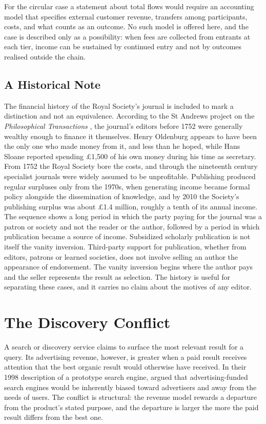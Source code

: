 \documentclass[12pt, a4paper]{article}
\begin{document}
For the circular case a statement about total flows would require an accounting model that specifies external customer revenue, transfers among participants, costs, and what counts as an outcome. No such model is offered here, and the case is described only as a possibility: when fees are collected from entrants at each tier, income can be sustained by continued entry and not by outcomes realised outside the chain.

\subsection{A Historical Note}

The financial history of the Royal Society's journal is included to mark a distinction and not an equivalence. According to the St Andrews project on the \emph{Philosophical Transactions} \citep{StAndrewsPT}, the journal's editors before 1752 were generally wealthy enough to finance it themselves. Henry Oldenburg appears to have been the only one who made money from it, and less than he hoped, while Hans Sloane reported spending \pounds1,500 of his own money during his time as secretary. From 1752 the Royal Society bore the costs, and through the nineteenth century specialist journals were widely assumed to be unprofitable. Publishing produced regular surpluses only from the 1970s, when generating income became formal policy alongside the dissemination of knowledge, and by 2010 the Society's publishing surplus was about \pounds1.4 million, roughly a tenth of its annual income. The sequence shows a long period in which the party paying for the journal was a patron or society and not the reader or the author, followed by a period in which publication became a source of income. Subsidized scholarly publication is not itself the vanity inversion. Third-party support for publication, whether from editors, patrons or learned societies, does not involve selling an author the appearance of endorsement. The vanity inversion begins where the author pays and the seller represents the result as selection. The history is useful for separating these cases, and it carries no claim about the motives of any editor.

\section{The Discovery Conflict}
\label{sec:discovery}

A search or discovery service claims to surface the most relevant result for a query. Its advertising revenue, however, is greater when a paid result receives attention that the best organic result would otherwise have received. In their 1998 description of a prototype search engine, \citet{BrinPage1998} argued that advertising-funded search engines would be inherently biased toward advertisers and away from the needs of users. The conflict is structural: the revenue model rewards a departure from the product's stated purpose, and the departure is larger the more the paid result differs from the best one.
\end{document}
